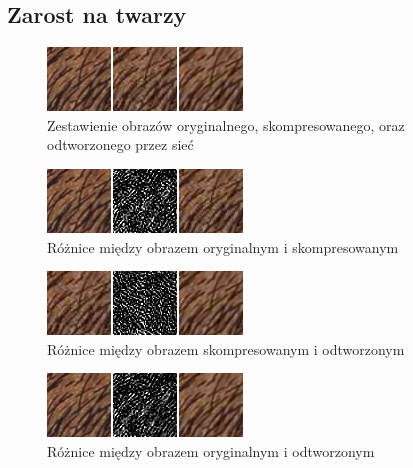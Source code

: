 \documentclass[a4paper,11pt]{article}
\begin{document}
\newpage
\subsection{Zarost na twarzy}
\begin{figure}[h!]
\begin{center}
	\includegraphics[width=0.85\columnwidth]{compare_sample2.png}
	\caption{Zestawienie obrazów oryginalnego, skompresowanego, oraz odtworzonego przez sieć}
\end{center}
\end{figure}
\begin{figure}[h!]
\begin{center}
	\includegraphics[width=0.85\columnwidth]{orig_vs_comp2.png}
	\caption{Różnice między obrazem oryginalnym i skompresowanym}
\end{center}
\end{figure}
\begin{figure}[h!]
\begin{center}
	\includegraphics[width=0.85\columnwidth]{comp_vs_rest2.png}
	\caption{Różnice między obrazem skompresowanym i odtworzonym}
\end{center}
\end{figure}
\begin{figure}[h!]
\begin{center}
	\includegraphics[width=0.85\columnwidth]{orig_vs_rest2.png}
	\caption{Różnice między obrazem oryginalnym i odtworzonym}
\end{center}
\end{figure}
\end{document}

